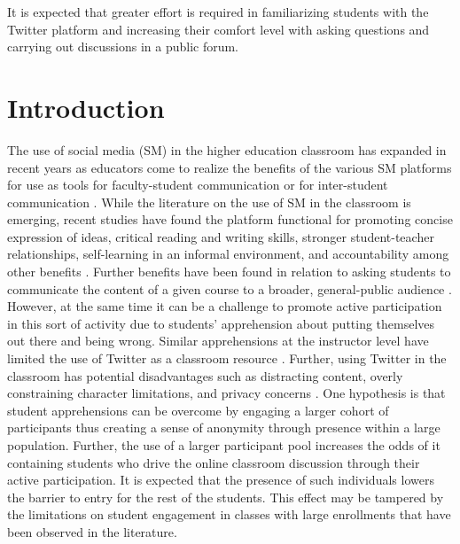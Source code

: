 \documentclass[12pt]{article}
\begin{document}
It is expected that greater effort is required in familiarizing students with the Twitter platform and increasing their comfort level with asking questions and carrying out discussions in a public forum.



\section*{Introduction}

The use of social media (SM) in the higher education classroom has expanded in recent years as educators come to realize the benefits of the various SM platforms for use as tools for faculty-student communication or for inter-student communication \cite{blessing_using_2012}. While the literature on the use of SM in the classroom is emerging, recent studies have found the platform functional for promoting concise expression of ideas, critical reading and writing skills, stronger student-teacher relationships, self-learning in an informal environment, and accountability among other benefits \cite{shiffman_twitter_2012}. Further benefits have been found in relation to asking students to communicate the content of a given course to a broader, general-public audience \cite{junco_effect_2011, ha_influence_2013}. However, at the same time it can be a challenge to promote active participation in this sort of activity due to students’ apprehension about putting themselves out there and being wrong. Similar apprehensions at the instructor level have limited the use of Twitter as a classroom resource \cite{carpenter_how_2014}. Further, using Twitter in the classroom has potential disadvantages such as distracting content, overly constraining character limitations, and privacy concerns \cite{dhir_tweeters_2013}. One hypothesis is that student apprehensions can be overcome by engaging a larger cohort of participants thus creating a sense of anonymity through presence within a large population. Further, the use of a larger participant pool increases the odds of it containing students who drive the online classroom discussion through their active participation. It is expected that the presence of such individuals lowers the barrier to entry for the rest of the students. This effect may be tampered by the limitations on student engagement in classes with large enrollments that have been observed in the literature. \cite{ahlfeldt_measurement_2005}
\end{document}
